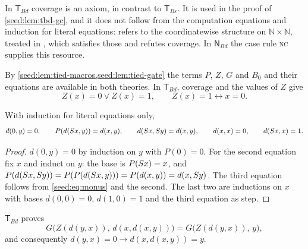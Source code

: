 In $\mathsf{T}_{Bd}$ coverage is an axiom, in contrast to
$\mathsf{T}_{B\varepsilon}$. It is used in the proof of
\cref{seed:lem:tbd-gc}, and it does not follow from the computation
equations and induction for literal equations: 
refers to the coordinatewise structure on $\mathbb N\times\mathbb N$, treated
in , which satisfies those and refutes coverage. In
$\mathsf{N}_{Bd}$ the case rule \textsc{nc} supplies this resource.

By \cref{seed:lem:tied-macros,seed:lem:tied-gate} the terms $P$, $Z$, $G$
and $B_0$ and their equations are available in both theories. In
$\mathsf{T}_{Bd}$, coverage and the values of $Z$ give
\begin{equation}\label{seed:eq:tbd-Z}
 Z(x)=0\lor Z(x)=1,\qquad Z(x)=1\leftrightarrow x=0 .
\end{equation}

\begin{lemma}\label{seed:lem:tbd-prelim}
With induction for literal equations only,
\[
 d(0,y)=0,\qquad P(d(S x,y))=d(x,y),\qquad d(S x,S y)=d(x,y),
 \qquad d(x,x)=0,\qquad d(S x,x)=1 .
\]
\end{lemma}

\begin{proof}
$d(0,y)=0$ by induction on $y$ with $P(0)=0$. For the second equation fix
$x$ and induct on $y$: the base is $P(S x)=x$, and
$P(d(S x,S y))=P(P(d(S x,y)))=P(d(x,y))=d(x,S y)$. The third
equation follows from \eqref{seed:eq:monus} and the second. The last two are
inductions on $x$ with bases $d(0,0)=0$, $d(1,0)=1$ and the third equation
as step.
\end{proof}

\begin{lemma}\label{seed:lem:tbd-gc}
$\mathsf{T}_{Bd}$ proves
\begin{equation}\label{seed:eq:gc}
 G\bigl(Z(d(y,x)),\,d(x,d(x,y))\bigr)=G\bigl(Z(d(y,x)),\,y\bigr),
\end{equation}
and consequently $d(y,x)=0\to d(x,d(x,y))=y$.
\end{lemma}

